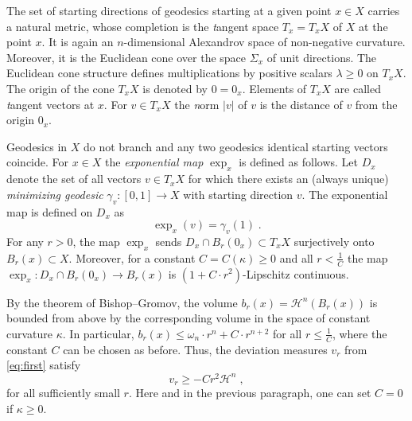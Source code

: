 \documentclass[12pt,leqno]{amsart}
\numberwithin{equation}{section}
\theoremstyle{definition}
\theoremstyle{remark}
\def\:{\colon}
\begin{document}
The set of starting directions of geodesics starting at a given point $x\in X$ carries a natural metric, whose completion is the {\emph tangent space} $T_x=T_xX$
of $X$ at the point $x$.  It is again an $n$-dimensional Alexandrov space of non-negative curvature. Moreover, it is the Euclidean cone
over the space $\Sigma _x$ of unit directions. The Euclidean cone structure defines multiplications by positive scalars $\lambda \geq 0$ on $T_xX$. The origin
of the cone $T_xX$ is denoted by $0=0_x$. Elements of $T_xX$ are called {\emph tangent vectors} at $x$. For $v\in T_xX$ the {\emph norm} $|v|$ of $v$ is the distance of $v$ from the origin $0_x$.


 Geodesics in $X$ do not branch and any two geodesics identical  starting vectors coincide.
For  $x\in X$ the \emph{exponential map}  $\exp_x $ is defined as follows.  Let $D_x$ denote the set of all vectors $v\in T_xX$
 for which there exists an (always unique)  \emph{minimizing geodesic}  $\gamma _v:[0,1] \to X$ with starting direction $v$.  The exponential map is defined on $D_x$ as
 $$\exp _x (v)= \gamma _v(1) \;.$$
 For  any $r>0$, the map $\exp_x$ sends  $D_x\cap B_r (0_x)\subset T_xX$ surjectively onto $B_r(x)\subset X$.
 Moreover, for a constant $C=C(\kappa)\geq 0$  and all $r< \frac 1 C$ the map $\exp_x \:D_x \cap B_r(0_x) \to B_r(x)$ is  $(1+ C \cdot  r^2)$-Lipschitz continuous.



By the theorem of Bishop--Gromov, the volume $b_r (x)=\mathcal H^n (B_r(x))$ is bounded from above by the corresponding volume in the
space of constant curvature $\kappa$. In particular, $b_r (x) \leq \omega _n \cdot r^n + C \cdot r^{n+2}$ for all $r\leq \frac 1 C$, where
the constant $C$ can be chosen as before.  Thus, the deviation measures  $v_r $ from \eqref{eq:first} satisfy
$$v_r \geq -Cr^2 \mathcal H^n \; ,$$  for all sufficiently small $r$.
 Here and in the previous paragraph,  one can set $C=0$ if $\kappa \geq 0$.

\end{document}

